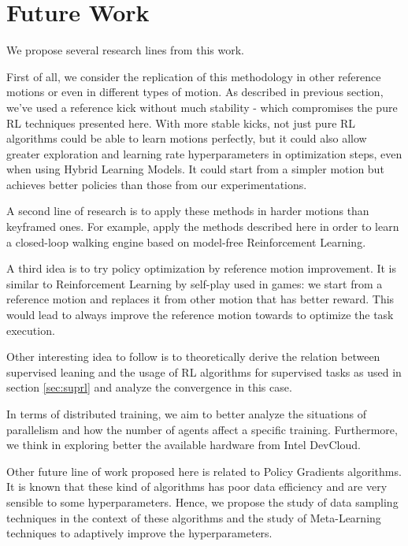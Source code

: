 \section{Future Work}

We propose several research lines from this work.

First of all, we consider the replication of this methodology in other reference motions or even in different types of motion. As described in previous section, we've used a reference kick without much stability - which compromises the pure RL techniques presented here. With more stable kicks, not just pure RL algorithms could be able to learn motions perfectly, but it could also allow greater exploration and learning rate hyperparameters in optimization steps, even when using Hybrid Learning Models. It could start from a simpler motion but achieves better policies than those from our experimentations.

A second line of research is to apply these methods in harder motions than keyframed ones. For example, apply the methods described here in order to learn a closed-loop walking engine based on model-free Reinforcement Learning.

A third idea is to try policy optimization by reference motion improvement. It is similar to Reinforcement Learning by self-play used in games: we start from a reference motion and replaces it from other motion that has better reward. This would lead to always improve the reference motion towards to optimize the task execution.

Other interesting idea to follow is to theoretically derive the relation between supervised leaning and the usage of RL algorithms for supervised tasks as used in section \ref{sec:suprl} and analyze the convergence in this case.

In terms of distributed training, we aim to better analyze the situations of parallelism and how the number of agents affect a specific training. Furthermore, we think in exploring better the available hardware from Intel DevCloud.


Other future line of work proposed here is related to Policy Gradients algorithms. It is known that these kind of algorithms has poor data efficiency and are very sensible to some hyperparameters. Hence, we propose the study of data sampling techniques in the context of these algorithms and the study of Meta-Learning techniques \cite{metalearning} to adaptively improve the hyperparameters.


